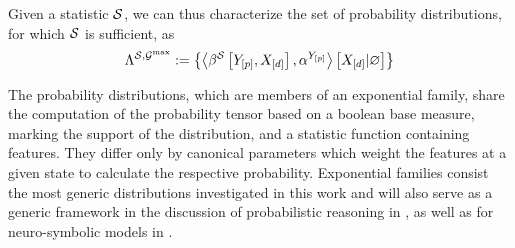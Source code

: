 Given a statistic $\mathcal{S}$, we can thus characterize the set of probability distributions, for which $\mathcal{S}$ is sufficient, as
\begin{align*} %
    \realizabledistsof{\sstat,\maxgraph}
    := \left\{\normalizationof{\bencodingofat{\sstat}{\headvariableof{[\seldim]},\shortcatvariables},\actcoreof{\headvariableof{[\seldim]}}}{\shortcatvariables} \right\}
\end{align*}





The probability distributions, which are members of an exponential family, share the computation of the probability tensor based on a boolean base measure, marking the support of the distribution, and a statistic function containing features.
They differ only by canonical parameters which weight the features at a given state to calculate the respective probability.
Exponential families consist the most generic distributions investigated in this work and will also serve as a generic framework in the discussion of probabilistic reasoning in , as well as for neuro-symbolic models in .



